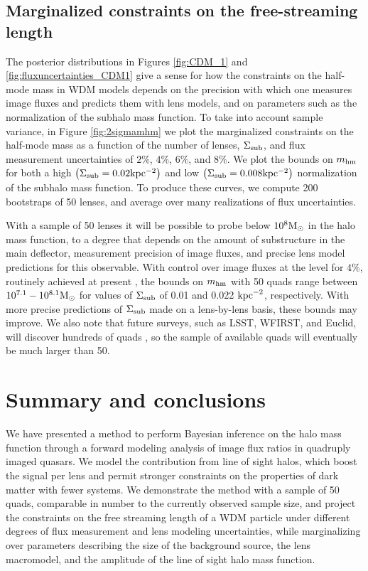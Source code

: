 \subsection{Marginalized constraints on the free-streaming length}
\label{ssec:marginalized}
The posterior distributions in Figures \ref{fig:CDM_1} and \ref{fig:fluxuncertainties_CDM1} give a sense for how the constraints on the half-mode mass in WDM models depends on the precision with which one measures image fluxes and predicts them with lens models, and on parameters such as the normalization of the subhalo mass function. To take into account sample variance, in Figure \ref{fig:2sigmamhm} we plot the marginalized constraints on the half-mode mass as a function of the number of lenses, $\Sigma_{\rm{sub}}$, and flux measurement uncertainties of $2\%$, $4\%$, $6\%$, and $8\%$. We plot the bounds on ${m_{\rm{hm}}}$ for both a high $\left(\Sigma_{\rm{sub}} = 0.02 \rm{kpc^{-2}}\right)$ and low $\left(\Sigma_{\rm{sub}} = 0.008 \rm{kpc^{-2}}\right)$ normalization of the subhalo mass function. To produce these curves, we compute 200 bootstraps of 50 lenses, and average over many realizations of flux uncertainties. 

With a sample of 50 lenses it will be possible to probe below $10^8 {\rm{M}_{\odot}}$ in the halo mass function, to a degree that depends on the amount of substructure in the main deflector, measurement precision of image fluxes, and precise lens model predictions for this observable. With control over image fluxes at the level for $4\%$, routinely achieved at present \citep{Nierenberg++14,Nierenberg++17}, the bounds on ${m_{\rm{hm}}}$ with 50 quads range between $10^{7.1} - 10^{8.1}{\rm{M}_{\odot}}$ for values of $\Sigma_{\rm{sub}}$ of 0.01 and 0.022 $\rm{kpc}^{-2}$, respectively. With more precise predictions of $\Sigma_{\rm{sub}}$ made on a lens-by-lens basis, these bounds may improve.  We also note that future surveys, such as LSST, WFIRST, and Euclid, will discover hundreds of quads \citep{OguriMarshall10}, so the sample of available quads will eventually be much larger than 50. 

\section{Summary and conclusions}
\label{sec:conclusion}
We have presented a method to perform Bayesian inference on the halo mass function through a forward modeling analysis of image flux ratios in quadruply imaged quasars. We model the contribution from line of sight halos, which boost the signal per lens and permit stronger constraints on the properties of dark matter with fewer systems. We demonstrate the method with a sample of 50 quads, comparable in number to the currently observed sample size, and project the constraints on the free streaming length of a WDM particle under different degrees of flux measurement and lens modeling uncertainties, while marginalizing over parameters describing the size of the background source, the lens macromodel, and the amplitude of the line of sight halo mass function. 

